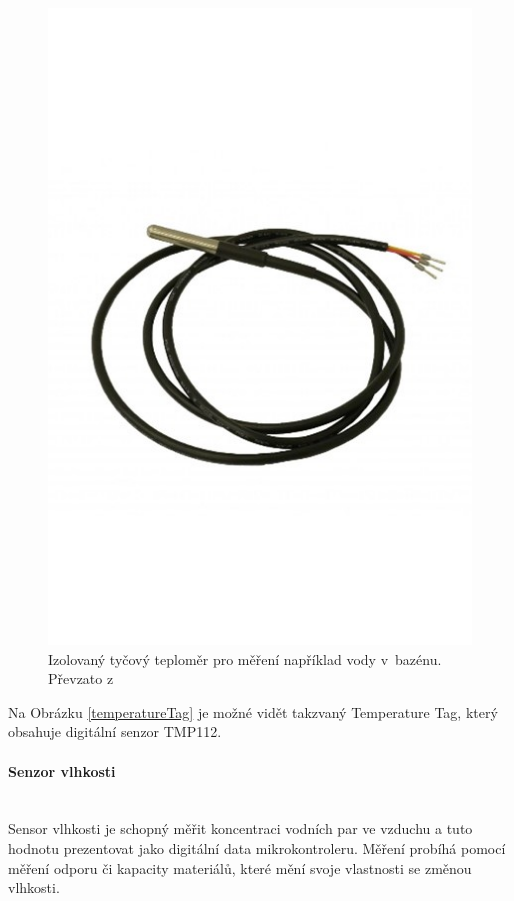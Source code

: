 \begin{figure}[H]
\begin{minipage}[b]{0.3\textwidth}
    \includegraphics[width=\textwidth]{obrazky-figures/hardwareComponents/temperatureSensor.jpg}
    \caption{Izolovaný tyčový teploměr pro měření například vody v~bazénu. Převzato z~\cite{shop-hardwario}}
    \label{ds18b20Image}
  \end{minipage}
\end{figure}

Na Obrázku \ref{temperatureTag} je možné vidět takzvaný Temperature Tag, který obsahuje digitální senzor TMP112.

\paragraph*{Senzor vlhkosti}\mbox{} \\
Sensor vlhkosti je schopný měřit koncentraci vodních par ve vzduchu a tuto hodnotu prezentovat jako digitální data mikrokontroleru. Měření probíhá pomocí měření odporu či kapacity materiálů, které mění svoje vlastnosti se změnou vlhkosti.

